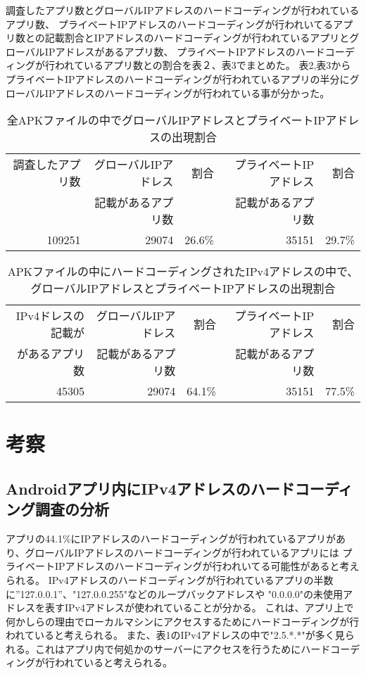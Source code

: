 \documentclass[a4j]{jarticle}
\begin{document}
調査したアプリ数とグローバルIPアドレスのハードコーディングが行われているアプリ数、
プライベートIPアドレスのハードコーディングが行われいてるアプリ数との記載割合とIPアドレスのハードコーディングが行われているアプリとグローバルIPアドレスがあるアプリ数、
プライベートIPアドレスのハードコーディングが行われているアプリ数との割合を表２、表3でまとめた。
表2,表3からプライベートIPアドレスのハードコーディングが行われているアプリの半分にグローバルIPアドレスのハードコーディングが行われている事が分かった。

\begin{table}[htb]
\begin{center}
	\caption{全APKファイルの中でグローバルIPアドレスとプライベートIPアドレスの出現割合}
	\begin{tabular}{|r|r|r|r|r|}

	\hline
	調査したアプリ数 & グローバルIPアドレス & 割合 & プライベートIPアドレス&割合 \\
	&記載があるアプリ数 & &記載があるアプリ数 &\\
	\hline
		109251 & 29074 & 26.6\% & 35151&29.7\% \\
	\hline
	\end{tabular}
	\end{center}
\end{table}

\begin{table}[htb]
	\begin{center}
		\caption{APKファイルの中にハードコーディングされたIPv4アドレスの中で、グローバルIPアドレスとプライベートIPアドレスの出現割合}
		\begin{tabular}{|r|r|r|r|r|}
	
		\hline
		IPv4ドレスの記載が& グローバルIPアドレス & 割合 & プライベートIPアドレス&割合 \\
		があるアプリ数&記載があるアプリ数 & &記載があるアプリ数 &\\
		\hline
			45305 & 29074 & 64.1\% & 35151&77.5\% \\
		\hline
		\end{tabular}
		\end{center}
	\end{table}


\newpage
\section{考察}
\subsection{Androidアプリ内にIPv4アドレスのハードコーディング調査の分析}
アプリの44.1\%にIPアドレスのハードコーディングが行われているアプリがあり、グローバルIPアドレスのハードコーディングが行われているアプリには
プライベートIPアドレスのハードコーディングが行われいてる可能性があると考えられる。
IPv4アドレスのハードコーディングが行われているアプリの半数に”127.0.0.1”、"127.0.0.255"などのループバックアドレスや
"0.0.0.0"の未使用アドレスを表すIPv4アドレスが使われていることが分かる。
これは、アプリ上で何かしらの理由でローカルマシンにアクセスするためにハードコーディングが行われていると考えられる。
また、表1のIPv4アドレスの中で"2.5.*.*"が多く見られる。これはアプリ内で何処かのサーバーにアクセスを行うためにハードコーディングが行われていると考えられる。
\end{document}
